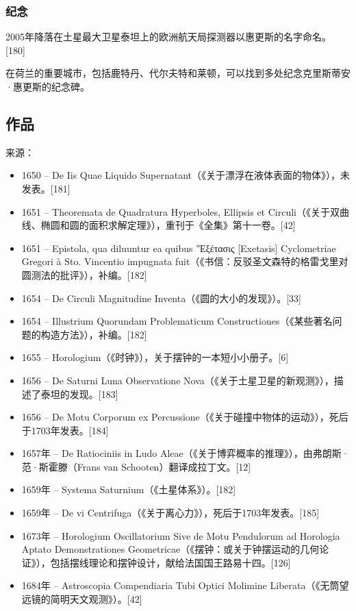\subsubsection{纪念}
2005年降落在土星最大卫星泰坦上的欧洲航天局探测器以惠更斯的名字命名。[180]

在荷兰的重要城市，包括鹿特丹、代尔夫特和莱顿，可以找到多处纪念克里斯蒂安·惠更斯的纪念碑。

\subsection{作品}
来源：

\begin{itemize}
\item 1650 – De Iis Quae Liquido Supernatant（《关于漂浮在液体表面的物体》），未发表。[181]
\item 1651 – Theoremata de Quadratura Hyperboles, Ellipsis et Circuli（《关于双曲线、椭圆和圆的面积求解定理》），重刊于《全集》第十一卷。[42]
\item 1651 – Epistola, qua diluuntur ea quibus 'Ἐξέτασις [Exetasis] Cyclometriae Gregori à Sto. Vincentio impugnata fuit（《书信：反驳圣文森特的格雷戈里对圆测法的批评》），补编。[182]
\item 1654 – De Circuli Magnitudine Inventa（《圆的大小的发现》）。[33]
\item 1654 – Illustrium Quorundam Problematicum Constructiones（《某些著名问题的构造方法》），补编。[182]
\item 1655 – Horologium（《时钟》），关于摆钟的一本短小小册子。[6]
\item 1656 – De Saturni Luna Observatione Nova（《关于土星卫星的新观测》），描述了泰坦的发现。[183]
\item 1656 – De Motu Corporum ex Percussione（《关于碰撞中物体的运动》），死后于1703年发表。[184]
\item 1657年 – De Ratiociniis in Ludo Aleae（《关于博弈概率的推理》），由弗朗斯·范·斯霍滕（Frans van Schooten）翻译成拉丁文。[12]
\item 1659年 – Systema Saturnium（《土星体系》）。[182]
\item 1659年 – De vi Centrifuga（《关于离心力》），死后于1703年发表。[185]
\item 1673年 – Horologium Oscillatorium Sive de Motu Pendulorum ad Horologia Aptato Demonstrationes Geometricae（《摆钟：或关于钟摆运动的几何论证》），包括摆线理论和摆钟设计，献给法国国王路易十四。[126]
\item 1684年 – Astroscopia Compendiaria Tubi Optici Molimine Liberata（《无筒望远镜的简明天文观测》）。[42]

\end{itemize}
